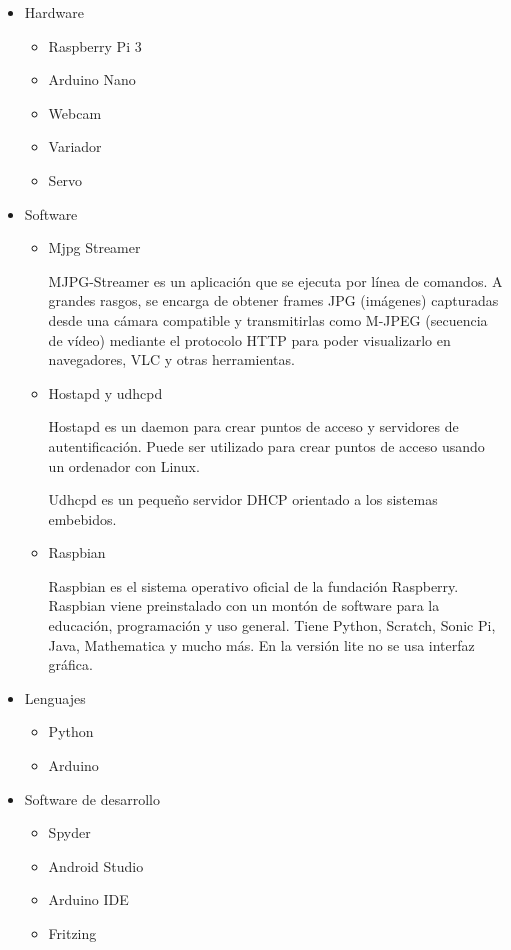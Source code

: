 \documentclass{pclass}
\begin{document}
\begin{itemize}
	\item Hardware
		\begin{itemize}
			\item Raspberry Pi 3
			\item Arduino Nano
			\item Webcam
			\item Variador
			\item Servo
		\end{itemize}
	\item Software
	\begin{itemize}
		\item Mjpg Streamer
		
		MJPG-Streamer es un aplicación que se ejecuta por línea de comandos. A grandes rasgos, se encarga de obtener frames JPG (imágenes) capturadas desde una cámara compatible y transmitirlas como M-JPEG (secuencia de vídeo) mediante el protocolo HTTP para poder visualizarlo en navegadores, VLC y otras herramientas.
			\cite{mjpg}
		
		\item Hostapd y udhcpd
		
		Hostapd es un daemon para crear puntos de acceso y servidores de autentificación. Puede ser utilizado para crear puntos de acceso usando un ordenador con Linux. 
		
		Udhcpd es un pequeño servidor DHCP orientado a los sistemas embebidos.
		
			\cite{wireless}
		
		\item Raspbian	
		
		Raspbian es el sistema operativo oficial de la fundación Raspberry. Raspbian viene preinstalado con un montón de software para la educación, programación y uso general. Tiene Python, Scratch, Sonic Pi, Java, Mathematica y mucho más. En la versión lite no se usa interfaz gráfica.
		
			\cite{raspbian}
				
	\end{itemize}
	\item Lenguajes
		\begin{itemize}
			\item Python
			\item Arduino
		\end{itemize}
	\item Software de desarrollo
	\begin{itemize}
		\item Spyder
		\item Android Studio
		\item Arduino IDE
		\item Fritzing
		

\end{itemize}
\end{itemize}
\end{document}
